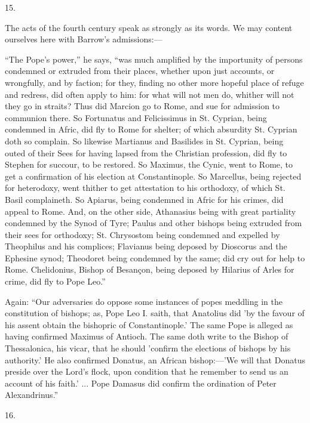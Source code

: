 15.

The acts of the fourth century speak as strongly as
its words. We may content ourselves here with Barrow's
admissions:—

``The Pope's power,'' he says, ``was much
amplified by the importunity of persons condemned or
extruded from their places, whether upon just accounts,
or wrongfully, and by faction; for they, finding no other
more hopeful place of refuge and redress, did often apply
to him: for what will not men do, whither will not they
go in straits? Thus did Marcion go to Rome, and sue for
admission to communion there. So Fortunatus and
Felicissimus in St. Cyprian, being condemned in Afric,
did fly to Rome for shelter; of which absurdity St.
Cyprian doth so complain. So likewise Martianus and
Basilides in St. Cyprian, being outed of their Sees for
having lapsed from the Christian profession, did fly to
Stephen for succour, to be restored. So Maximus, the
Cynic, went to Rome, to get a confirmation of his
election at Constantinople. So Marcellus, being rejected
for heterodoxy, went thither to get attestation to his
orthodoxy, of which St. Basil complaineth. So Apiarus,
being condemned in Afric for his crimes, did appeal to
Rome. And, on the other side, Athanasius being with great
partiality condemned by the Synod of Tyre; Paulus and
other bishops being extruded from their sees for
orthodoxy; St. Chrysostom being condemned and expelled by
Theophilus and his complices; Flavianus being deposed by
Dioscorus and the Ephesine synod; Theodoret being
condemned by the same; did cry out for help to Rome.
Chelidonius, Bishop of Besançon, being deposed by
Hilarius of Arles for crime, did fly to Pope Leo.''

Again: ``Our adversaries do oppose some instances
of popes meddling in the constitution of bishops; as,
Pope Leo I. saith, that Anatolius did 'by the favour of
his assent obtain the bishopric of Constantinople.' The
same Pope is alleged as having confirmed Maximus of
Antioch. The same doth write to the Bishop of
Thessalonica, his vicar, that he should 'confirm the
elections of bishops by his authority.' He also confirmed
Donatus, an African bishop:—'We will that Donatus
preside over the Lord's flock, upon condition that he
remember to send us an account of his faith.' ... Pope
Damasus did confirm the ordination of Peter
Alexandrinus.''

16.

